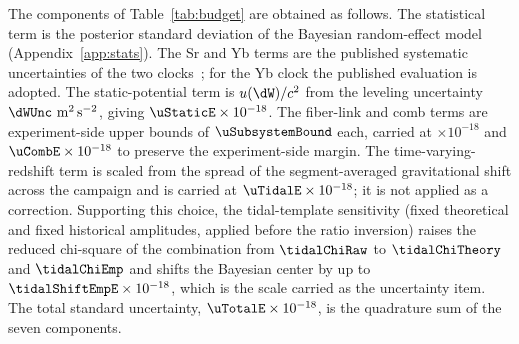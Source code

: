The components of Table~\ref{tab:budget} are obtained as follows.
The statistical term is the posterior standard deviation of the
Bayesian random-effect model (Appendix~\ref{app:stats}). The Sr and
Yb terms are the published systematic uncertainties of the two
clocks~\citep{jia2026sr, zhu2026yb}; for the Yb clock the published
evaluation is adopted. The static-potential term is
$u(\dW)/c^2$ from the leveling uncertainty
$\dWUnc~\mathrm{m^2\,s^{-2}}$, giving
$\uStaticE \times 10^{-18}$. The fiber-link and comb terms are
experiment-side upper bounds of $\uSubsystemBound$ each, carried at
\uLinkE $\times 10^{-18}$ and $\uCombE \times 10^{-18}$ to preserve the
experiment-side margin. The time-varying-redshift term is scaled from
the spread of the segment-averaged gravitational shift across the
campaign and is carried at $\uTidalE \times 10^{-18}$; it is not
applied as a correction. Supporting this choice, the tidal-template
sensitivity (fixed theoretical and fixed historical amplitudes,
applied before the ratio inversion) raises the reduced chi-square of
the combination from $\tidalChiRaw$ to $\tidalChiTheory$ and
$\tidalChiEmp$ and shifts the Bayesian center by up to
$\tidalShiftEmpE \times 10^{-18}$, which is the scale carried as the
uncertainty item. The total standard uncertainty,
$\uTotalE \times 10^{-18}$, is the quadrature sum of the seven
components.
